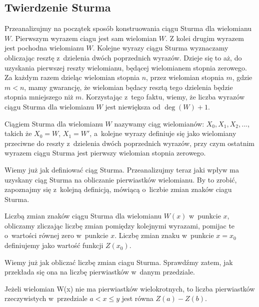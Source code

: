\subsection{Twierdzenie Sturma}

Przeanalizujmy na początek sposób konstruowania ciągu Sturma dla wielomianu $W$. Pierwszym wyrazem ciagu jest sam wielomian $W$. Z kolei drugim wyrazem jest pochodna wielomianu $W$. Kolejne wyrazy ciągu Sturma wyznaczamy obliczając resztę z~dzielenia dwóch poprzednich wyrazów. Dzieje się to aż, do uzyskania pierwszej reszty wielomianu, będącej wielomianem stopnia zerowego. Za każdym razem dzieląc wielomian stopnia $n$, przez wielomian stopnia $m$, gdzie $m<n$, mamy gwarancję, że wielomian będacy resztą tego dzielenia będzie stopnia mniejszego niż $m$. Korzystając z~tego faktu, wiemy, że liczba wyrazów ciągu Sturma dla wielomianu $W$ jest niewiększa od $\deg(W)+1$.

\begin{definition}
	$ $ \\
	Ciągiem Sturma dla wielomianu $W$ nazywamy ciąg wielomianów: $X_0, X_1, X_2,...$, takich że $X_0=W$, $X_1=W'$, a~kolejne wyrazy definiuje się jako wielomiany przeciwne do reszty z~dzielenia dwóch poprzednich wyrazów, przy czym ostatnim wyrazem ciągu Sturma jest pierwszy wielomian stopnia zerowego. 
\end{definition}

Wiemy już jak definiować ciąg Sturma. Przeanalizujmy teraz jaki wpływ ma uzyskany ciąg Sturma na obliczanie pierwiastków wielomianu. By to zrobić, zapoznajmy się z~kolejną definicją, mówiącą o~liczbie zmian znaków ciagu Sturma.

\begin{definition}
	$ $ \\
	Liczbą zmian znaków ciągu Sturma dla wielomianu $W(x)$ w~punkcie $x$, obliczamy zliczając liczbę zmian pomiędzy kolejnymi wyrazami, pomijac te o~wartości równej zero w~punkcie $x$. Liczbę zmian znaku w~punkcie $x=x_0$ definiujemy jako wartość funkcji $Z(x_0)$.
\end{definition}

Wiemy już jak obliczać liczbę zmian ciagu Sturma. Sprawdźmy zatem, jak przekłada się ona na liczbę pierwiastków w~danym przedziale.

\begin{theorem}
	$ $ \\
	Jeżeli wielomian W(x) nie ma pierwiastków wielokrotnych, to liczba pierwiastków rzeczywistych w~przedziale $a<x\le y$ jest równa $Z(a) - Z(b)$.
\end{theorem}

